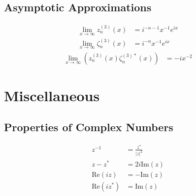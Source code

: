 \subsection{Asymptotic Approximations}

\begin{subequations}
\begin{align}
\lim_{x \rightarrow \infty} z_{n}^{(3)}(x) &= i^{-n-1} x^{-1} e^{ix}
\\
\lim_{x \rightarrow \infty} \zeta_{n}^{(3)}(x) &= i^{-n} x^{-1} e^{ix}
\end{align}
\end{subequations}
%
\begin{align}
\lim_{x \rightarrow \infty} \left( z_{n}^{(3)}(x) \zeta_{n}^{(3)*}(x) \right) &= -i x^{-2}
\end{align}

\section{Miscellaneous}

\subsection{Properties of Complex Numbers}
\begin{align}
z^{-1} &= \frac{z^{*}}{|z|^{2}} \\
z - z^{*} &= 2 i \mathrm{Im}(z) \\
\mathrm{Re}(iz) &= -\mathrm{Im}(z) \\
\mathrm{Re}(iz^{*}) &= \mathrm{Im}(z)
\end{align}

